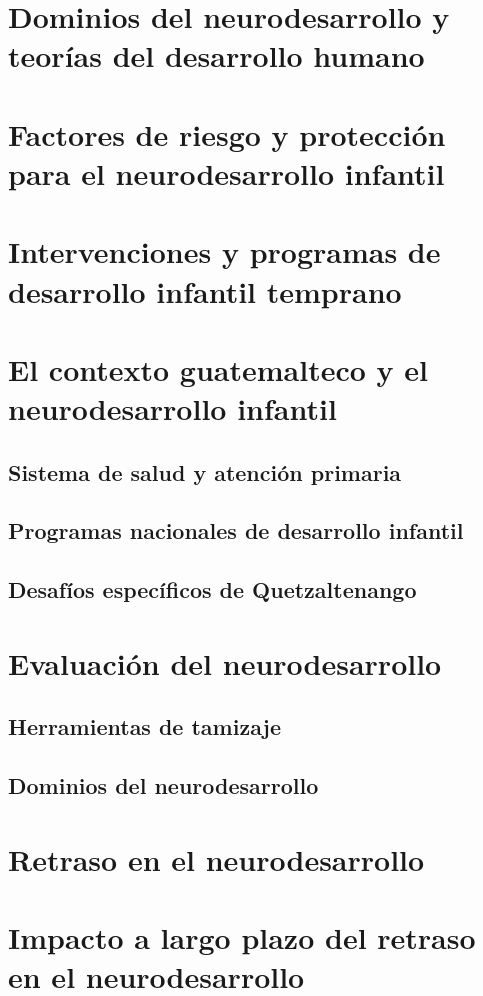 \documentclass[11pt,letterpaper]{report}
\begin{document}
\section{Dominios del neurodesarrollo y teorías del desarrollo humano}


\section{Factores de riesgo y protección para el neurodesarrollo infantil}

\section{Intervenciones y programas de desarrollo infantil temprano}

\section{El contexto guatemalteco y el neurodesarrollo infantil}
\subsection{Sistema de salud y atención primaria}
\subsection{Programas nacionales de desarrollo infantil}
\subsection{Desafíos específicos de Quetzaltenango}

\section{Evaluación del neurodesarrollo}
\subsection{Herramientas de tamizaje}
\subsection{Dominios del neurodesarrollo}

\section{Retraso en el neurodesarrollo}
\section{Impacto a largo plazo del retraso en el neurodesarrollo}
\end{document}
